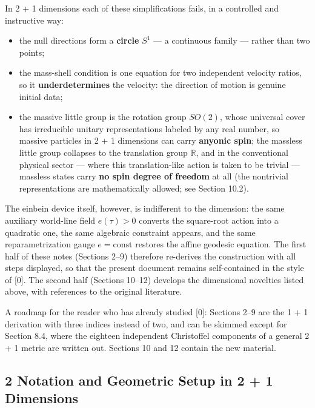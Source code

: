 \documentclass[
]{article}
\providecommand{\tightlist}{%
  \setlength{\itemsep}{0pt}\setlength{\parskip}{0pt}}
\begin{document}
In 2 + 1 dimensions each of these simplifications fails, in a controlled
and instructive way:

\begin{itemize}
\tightlist
\item
  the null directions form a \textbf{circle} \(S^{1}\) --- a continuous
  family --- rather than two points;
\item
  the mass-shell condition is one equation for two independent velocity
  ratios, so it \textbf{underdetermines} the velocity: the direction of
  motion is genuine initial data;
\item
  the massive little group is the rotation group \(SO(2)\), whose
  universal cover has irreducible unitary representations labeled by any
  real number, so massive particles in 2 + 1 dimensions can carry
  \textbf{anyonic spin}; the massless little group collapses to the
  translation group \(\mathbb{R}\), and in the conventional physical
  sector --- where this translation-like action is taken to be trivial
  --- massless states carry \textbf{no spin degree of freedom} at all
  (the nontrivial representations are mathematically allowed; see
  Section 10.2).
\end{itemize}

The einbein device itself, however, is indifferent to the dimension: the
same auxiliary world-line field \(e(\tau) > 0\) converts the square-root
action into a quadratic one, the same algebraic constraint appears, and
the same reparametrization gauge \(e = \mathrm{const}\) restores the
affine geodesic equation. The first half of these notes (Sections 2--9)
therefore re-derives the construction with all steps displayed, so that
the present document remains self-contained in the style of {[}0{]}. The
second half (Sections 10--12) develops the dimensional novelties listed
above, with references to the original literature.

A roadmap for the reader who has already studied {[}0{]}: Sections 2--9
are the 1 + 1 derivation with three indices instead of two, and can be
skimmed except for Section 8.4, where the eighteen independent
Christoffel components of a general 2 + 1 metric are written out.
Sections 10 and 12 contain the new material.

\hypertarget{notation-and-geometric-setup-in-2-1-dimensions}{%
\subsection{2 Notation and Geometric Setup in 2 + 1
Dimensions}\label{notation-and-geometric-setup-in-2-1-dimensions}}
\end{document}
